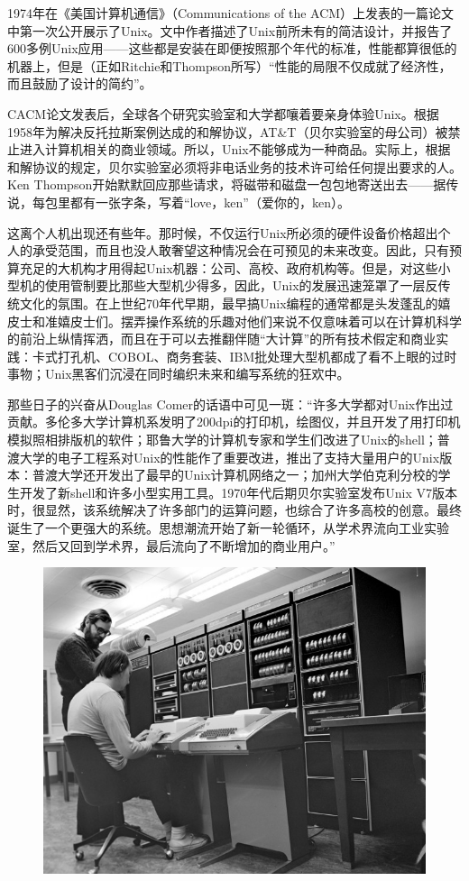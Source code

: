 \documentclass[12pt,oneside]{book}
\begin{document}
1974年在《美国计算机通信》（Communications of the ACM）上发表的一篇论文中\cite{Ritchie-Thompson}第一次公开展示了Unix。文中作者描述了Unix前所未有的简洁设计，并报告了600多例Unix应用——这些都是安装在即便按照那个年代的标准，性能都算很低的机器上，但是（正如Ritchie和Thompson所写）“性能的局限不仅成就了经济性，而且鼓励了设计的简约”。

CACM论文发表后，全球各个研究实验室和大学都嚷着要亲身体验Unix。根据1958年为解决反托拉斯案例达成的和解协议，AT\&{}T（贝尔实验室的母公司）被禁止进入计算机相关的商业领域。所以，Unix不能够成为一种商品。实际上，根据和解协议的规定，贝尔实验室必须将非电话业务的技术许可给任何提出要求的人。Ken Thompson开始默默回应那些请求，将磁带和磁盘一包包地寄送出去——据传说，每包里都有一张字条，写着“love，ken”（爱你的，ken）。

这离个人机出现还有些年。那时候，不仅运行Unix所必须的硬件设备价格超出个人的承受范围，而且也没人敢奢望这种情况会在可预见的未来改变。因此，只有预算充足的大机构才用得起Unix机器：公司、高校、政府机构等。但是，对这些小型机的使用管制要比那些大型机少得多，因此，Unix的发展迅速笼罩了一层反传统文化的氛围。在上世纪70年代早期，最早搞Unix编程的通常都是头发蓬乱的嬉皮士和准嬉皮士们。摆弄操作系统的乐趣对他们来说不仅意味着可以在计算机科学的前沿上纵情挥洒，而且在于可以去推翻伴随“大计算”的所有技术假定和商业实践：卡式打孔机、COBOL、商务套装、IBM批处理大型机都成了看不上眼的过时事物；Unix黑客们沉浸在同时编织未来和编写系统的狂欢中。

那些日子的兴奋从Douglas Comer的话语中可见一斑：“许多大学都对Unix作出过贡献。多伦多大学计算机系发明了200dpi的打印机，绘图仪，并且开发了用打印机模拟照相排版机的软件；耶鲁大学的计算机专家和学生们改进了Unix的shell；普渡大学的电子工程系对Unix的性能作了重要改进，推出了支持大量用户的Unix版本：普渡大学还开发出了最早的Unix计算机网络之一；加州大学伯克利分校的学生开发了新shell和许多小型实用工具。1970年代后期贝尔实验室发布Unix V7版本时，很显然，该系统解决了许多部门的运算问题，也综合了许多高校的创意。最终诞生了一个更强大的系统。思想潮流开始了新一轮循环，从学术界流向工业实验室，然后又回到学术界，最后流向了不断增加的商业用户。”\cite{Comer}

\begin{figure}[H]
\centering
\includegraphics[scale=7 , keepaspectratio]{1972-Ken-Dennis.jpg}
\end{figure}
\end{document}
